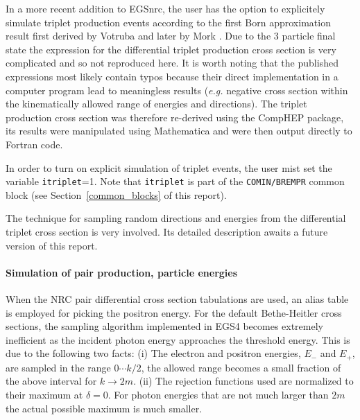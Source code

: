 In a more recent addition to EGSnrc, the user has the option
to explicitely simulate triplet production events according to the
first Born approximation result first derived by Votruba \cite{Vo48}
and later by Mork \cite{Mo67}. Due to the 3 particle final state the
expression for the differential triplet production cross section
is very complicated and so not reproduced here. It is worth
noting that the published expressions most likely contain typos
because their direct implementation in a computer program
lead to meaningless results ({\em e.g.} negative cross section within
the kinematically allowed range of energies and directions).
The triplet production cross section was therefore re-derived using
the CompHEP package, its results were manipulated using Mathematica and
were then output directly to Fortran code.

In order to turn on explicit simulation of triplet events, the user
mist set the variable {\tt itriplet}=1. Note that
{\tt itriplet} is part of the {\tt COMIN/BREMPR} common block
(see Section~\ref{common_blocks} of this report).

The technique for sampling random directions and energies from
the differential triplet cross section is very involved.
Its detailed description awaits a future version of this report.


\paragraph{Simulation of pair production, particle energies}\hfill
{}

When the NRC pair differential cross section tabulations are used,
an alias table is employed for picking the positron energy.
For the default Bethe-Heitler cross sections,
the sampling algorithm implemented in EGS4 becomes extremely
inefficient as the incident photon energy approaches the
threshold energy. This is due to the following two facts:
(i) The electron and positron energies, $E_-$ and $E_+$,
are sampled in the range $0\cdots k/2$, the allowed
range becomes a small fraction of the above interval for
$k \to 2 m$. (ii) The rejection functions used are normalized
to their maximum at $\delta = 0$. For photon energies that
are not much larger than $2 m$ the actual possible maximum
is much smaller.

